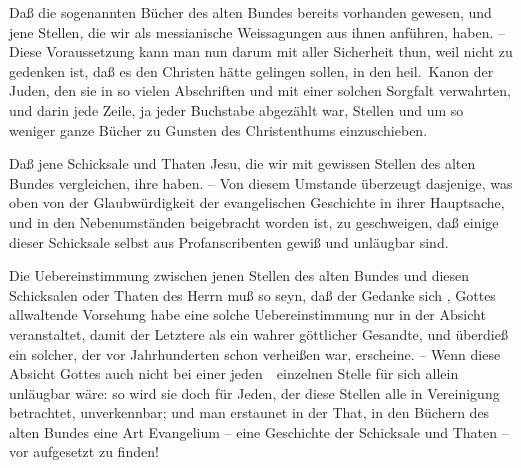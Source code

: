 \begin{aufza}
\item Daß die sogenannten Bücher des alten Bundes bereits  vorhanden gewesen, und jene Stellen, die wir als messianische Weissagungen aus ihnen anführen,  haben. -- Diese Voraussetzung kann man nun darum mit aller Sicherheit thun, weil nicht zu gedenken ist, daß es den Christen hätte gelingen sollen, in den heil.\ Kanon der Juden, den sie in so vielen Abschriften und mit einer solchen Sorgfalt verwahrten, und darin jede Zeile, ja jeder Buchstabe abgezählt war, Stellen und um so weniger ganze Bücher zu Gunsten des Christenthums einzuschieben.
\item Daß jene Schicksale und Thaten Jesu, die wir mit gewissen Stellen des alten Bundes vergleichen, ihre  haben. -- Von diesem Umstande überzeugt dasjenige, was oben von der Glaubwürdigkeit der evangelischen Geschichte in ihrer Hauptsache, und in den Nebenumständen beigebracht worden ist, zu geschweigen, daß einige dieser Schicksale  selbst aus Profanscribenten gewiß und unläugbar sind.
\item Die Uebereinstimmung zwischen jenen Stellen des alten Bundes und diesen Schicksalen oder Thaten des Herrn muß so  seyn, daß der Gedanke sich , Gottes allwaltende Vorsehung habe eine solche Uebereinstimmung nur in der Absicht veranstaltet, damit der Letztere als ein wahrer göttlicher Gesandte, und überdieß ein solcher, der vor Jahrhunderten schon verheißen war, erscheine. -- Wenn diese Absicht Gottes auch nicht bei einer jeden~\ einzelnen Stelle für sich allein unläugbar wäre: so wird sie doch für Jeden, der diese Stellen alle in Vereinigung betrachtet, unverkennbar; und man erstaunet in der That, in den Büchern des alten Bundes eine Art Evangelium -- eine Geschichte der Schicksale und Thaten  -- vor  aufgesetzt zu finden!
\end{aufza}
